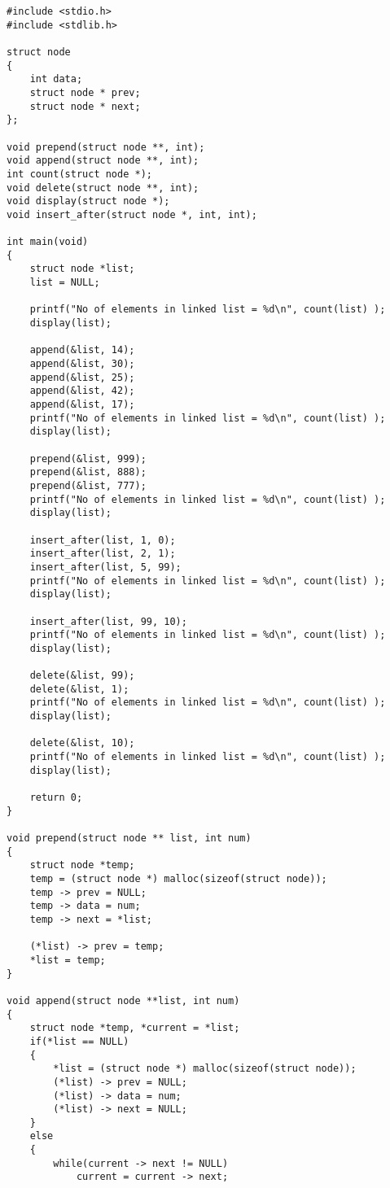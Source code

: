 \documentclass[10pt, a4paper, twosize]{article}
\begin{document}
\begin{lstlisting}
#include <stdio.h>
#include <stdlib.h>

struct node
{
    int data;
    struct node * prev;
    struct node * next;
};

void prepend(struct node **, int);
void append(struct node **, int);
int count(struct node *);
void delete(struct node **, int);
void display(struct node *);
void insert_after(struct node *, int, int);

int main(void)
{
    struct node *list;
    list = NULL;
    
    printf("No of elements in linked list = %d\n", count(list) );
    display(list);

    append(&list, 14);
    append(&list, 30);
    append(&list, 25);
    append(&list, 42);
    append(&list, 17);
    printf("No of elements in linked list = %d\n", count(list) );
    display(list);

    prepend(&list, 999);
    prepend(&list, 888);
    prepend(&list, 777);
    printf("No of elements in linked list = %d\n", count(list) );
    display(list);

    insert_after(list, 1, 0);
    insert_after(list, 2, 1);
    insert_after(list, 5, 99);
    printf("No of elements in linked list = %d\n", count(list) );
    display(list);

    insert_after(list, 99, 10);
    printf("No of elements in linked list = %d\n", count(list) );
    display(list);

    delete(&list, 99);
    delete(&list, 1);
    printf("No of elements in linked list = %d\n", count(list) );
    display(list);

    delete(&list, 10);
    printf("No of elements in linked list = %d\n", count(list) );
    display(list);

    return 0;
}

void prepend(struct node ** list, int num)
{
    struct node *temp;
    temp = (struct node *) malloc(sizeof(struct node));
    temp -> prev = NULL;
    temp -> data = num;
    temp -> next = *list;

    (*list) -> prev = temp;
    *list = temp;
}

void append(struct node **list, int num)
{
    struct node *temp, *current = *list;
    if(*list == NULL)
    {
        *list = (struct node *) malloc(sizeof(struct node));
        (*list) -> prev = NULL;
        (*list) -> data = num;
        (*list) -> next = NULL;
    }
    else
    {
        while(current -> next != NULL)
            current = current -> next;
            

\end{lstlisting}
\end{document}
